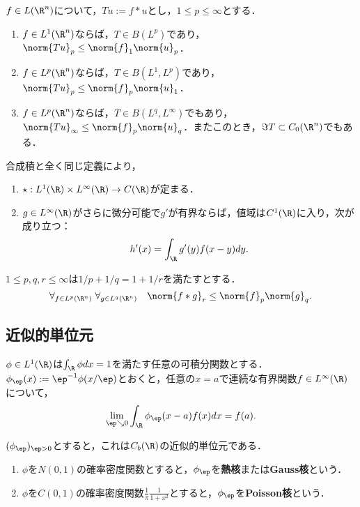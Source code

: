 \documentclass[uplatex, dvipdfmx]{jsreport}
\begin{document}
\begin{theorem}
    $f\in L(\R^n)$について，$Tu:=f*u$とし，$1\le p\le\infty$とする．
    \begin{enumerate}
        \item $f\in L^1(\R^n)$ならば，$T\in B(L^p)$であり，$\norm{Tu}_p\le\norm{f}_1\norm{u}_p$．
        \item $f\in L^p(\R^n)$ならば，$T\in B(L^1,L^p)$であり，$\norm{Tu}_p\le\norm{f}_p\norm{u}_1$．
        \item $f\in L^p(\R^n)$ならば，$T\in B(L^q,L^\infty)$でもあり，$\norm{Tu}_\infty\le\norm{f}_p\norm{u}_q$．またこのとき，$\Im T\subset C_0(\R^n)$でもある．
    \end{enumerate}
\end{theorem}

\begin{theorem}[合成積の変種]
    合成積と全く同じ定義により，
    \begin{enumerate}
        \item $\star:L^1(\R)\times L^\infty(\R)\to C(\R)$が定まる．
        \item $g\in L^\infty(\R)$がさらに微分可能で$g'$が有界ならば，値域は$C^1(\R)$に入り，次が成り立つ：
        \[h'(x)=\int_\R g'(y)f(x-y)dy.\]
    \end{enumerate}
\end{theorem}

\begin{theorem}
    $1\le p,q,r\le\infty$は$1/p+1/q=1+1/r$を満たすとする．
    \[\forall_{f\in L^p(\R^n)}\;\forall_{g\in L^q(\R^n)}\quad\norm{f*g}_r\le\norm{f}_p\norm{g}_q.\]
\end{theorem}

\subsection{近似的単位元}

\begin{theorem}[近似的単位元の存在]
    $\phi\in L^1(\R)$は$\int_\R\phi dx=1$を満たす任意の可積分関数とする．
    $\phi_\ep(x):=\ep^{-1}\phi(x/\ep)$とおくと，任意の$x=a$で連続な有界関数$f\in L^\infty(\R)$について，
    \[\lim_{\ep\searrow0}\int_\R\phi_\ep(x-a)f(x)dx=f(a).\]
\end{theorem}
\begin{remarks}
    $(\phi_\ep)_{\ep>0}$とすると，これは$C_b(\R)$の近似的単位元である．
    \begin{enumerate}
        \item $\phi$を$N(0,1)$の確率密度関数とすると，$\phi_\ep$を\textbf{熱核}または\textbf{Gauss核}という．
        \item $\phi$を$C(0,1)$の確率密度関数$\frac{1}{\pi}\frac{1}{1+x^2}$とすると，$\phi_\ep$を\textbf{Poisson核}という．
    \end{enumerate}
\end{remarks}
\end{document}
